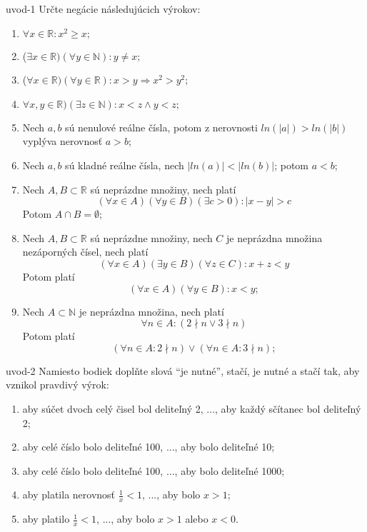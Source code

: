 \begin{defproblem}{uvod-1}
Určte negácie následujúcich výrokov:
\begin{enumerate}
  \item $\forall x \in \mathbb{R} : x^2 \geq x;$
  \item ($\exists x \in \mathbb{R})(\forall y \in \mathbb{N}): y \neq x;$
  \item ($\forall x \in \mathbb{R})(\forall y \in \mathbb{R}):
        x > y \Rightarrow x^2 > y^2;$
  \item $\forall x, y \in \mathbb{R})(\exists z \in \mathbb{N}): x < z \land
        y < z;$
  \item Nech $a, b$ sú nenulové reálne čísla, potom z nerovnosti $ln(|a|)
        > ln(|b|)$ vyplýva nerovnosť $a > b$;
  \item Nech $a, b$ sú kladné reálne čísla, nech $|ln(a)| < |ln(b)|$; potom
        $a < b$;
  \item Nech $A, B \subset \mathbb{R}$ sú neprázdne množiny, nech platí
        $$(\forall x \in A)(\forall y \in B)(\exists c > 0): |x - y| > c$$
        Potom $A \cap B = \emptyset$;
  \item Nech $A, B \subset \mathbb{R}$ sú neprázdne množiny, nech $C$ je
        neprázdna množina nezáporných čísel, nech platí
        $$(\forall x \in A)(\exists y \in B)(\forall z \in C): x + z < y$$
        Potom platí
        $$(\forall x \in A)(\forall y \in B): x < y;$$
  \item Nech $A \subset \mathbb{N}$ je neprázdna množina, nech platí
        $$\forall n \in A: (2 \nmid n \lor 3 \nmid n)$$
        Potom platí
        $$(\forall n \in A: 2 \nmid n) \lor (\forall n \in A: 3 \nmid n);$$
\end{enumerate}
\end{defproblem}

\begin{defproblem}{uvod-2}
Namiesto bodiek doplňte slová ``je nutné'', stačí, je nutné a stačí tak,
aby vznikol pravdivý výrok:

\begin{enumerate}
  \item aby súčet dvoch celý čisel bol deliteľný 2, ..., aby každý sčítanec bol deliteľný 2;
  \item aby celé číslo bolo deliteľné 100, ..., aby bolo deliteľné 10;
  \item aby celé číslo bolo deliteľné 100, ..., aby bolo deliteľné 1000;
  \item aby platila nerovnosť $\frac{1}{x} < 1$, ..., aby bolo $x > 1$;
  \item aby platilo $\frac{1}{x} < 1$, ..., aby bolo $x > 1$ alebo $x < 0$.
\end{enumerate}
\end{defproblem}
